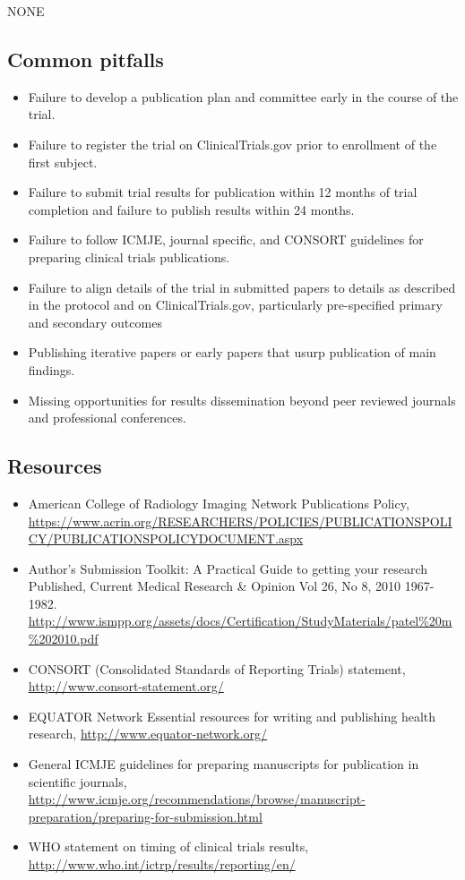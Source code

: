 \documentclass[]{book}
\providecommand{\tightlist}{%
  \setlength{\itemsep}{0pt}\setlength{\parskip}{0pt}}
\theoremstyle{definition}
\theoremstyle{definition}
\theoremstyle{definition}
\theoremstyle{remark}
\begin{document}
NONE

\subsection{Common pitfalls}\label{common-pitfalls-17}

\begin{itemize}
\tightlist
\item
  Failure to develop a publication plan and committee early in the
  course of the trial.
\item
  Failure to register the trial on ClinicalTrials.gov prior to
  enrollment of the first subject.
\item
  Failure to submit trial results for publication within 12 months of
  trial completion and failure to publish results within 24 months.
\item
  Failure to follow ICMJE, journal specific, and CONSORT guidelines for
  preparing clinical trials publications.
\item
  Failure to align details of the trial in submitted papers to details
  as described in the protocol and on ClinicalTrials.gov, particularly
  pre-specified primary and secondary outcomes
\item
  Publishing iterative papers or early papers that usurp publication of
  main findings.
\item
  Missing opportunities for results dissemination beyond peer reviewed
  journals and professional conferences.
\end{itemize}

\subsection{Resources}\label{resources-19}

\begin{itemize}
\tightlist
\item
  American College of Radiology Imaging Network Publications Policy,
  \url{https://www.acrin.org/RESEARCHERS/POLICIES/PUBLICATIONSPOLICY/PUBLICATIONSPOLICYDOCUMENT.aspx}
\item
  Author's Submission Toolkit: A Practical Guide to getting your
  research Published, Current Medical Research \& Opinion Vol 26, No 8,
  2010 1967-1982.
  \url{http://www.ismpp.org/assets/docs/Certification/StudyMaterials/patel\%20m\%202010.pdf}
\item
  CONSORT (Consolidated Standards of Reporting Trials) statement,
  \url{http://www.consort-statement.org/}
\item
  EQUATOR Network Essential resources for writing and publishing health
  research, \url{http://www.equator-network.org/}
\item
  General ICMJE guidelines for preparing manuscripts for publication in
  scientific journals,
  \url{http://www.icmje.org/recommendations/browse/manuscript-preparation/preparing-for-submission.html}
\item
  WHO statement on timing of clinical trials results,
  \url{http://www.who.int/ictrp/results/reporting/en/}
\end{itemize}
\end{document}
